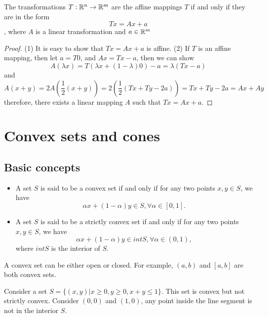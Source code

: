 \begin{refsection}
\begin{theorem}\cite[7]{rockafellar1997convex}
The transformations $T:\mathbb{R}^n\to \mathbb{R}^m$ are the affine mappings $T$ if and only if they are in the form $$Tx = Ax + a$$, where $A$ is a linear transformation and $a\in \mathbb{R}^m$
\end{theorem}
\begin{proof}
(1) It is easy to show that $Tx=Ax+a$ is affine. (2) If $T$ is an affine mapping, then let $a = T0$, and $Ax = Tx - a$, then we can show $$A(\lambda x) = T(\lambda x + (1-\lambda) 0) - a =\lambda (Tx - a)$$
and $$A(x + y) = 2A(\frac{1}{2}(x+y)) = 2(\frac{1}{2}(Tx + Ty -2a)) = Tx+Ty - 2a = Ax + Ay$$
therefore, there exists a linear mapping $A$ such that $Tx = Ax + a$.
\end{proof}

\section{Convex sets and cones}\label{ch:convex-optimization:sec:convex-set}
\subsection{Basic concepts}
\begin{definition}\hfill
\begin{itemize}
	\item 	A set $S$ is said to be a convex set if and only if for any two points $x,y\in S$, we have
	$$\alpha x + (1-\alpha) y \in S,\forall \alpha\in [0,1].$$
	\item 	A set $S$ is said to be a strictly convex set if and only if for any two points $x,y\in S$, we have
	$$\alpha x + (1-\alpha) y \in int S,\forall \alpha\in (0,1),$$
	where $int S$ is the interior of $S$.
\end{itemize}
\end{definition}

\begin{remark} A convex set can be either open or closed. For example, $(a,b)$ and $[a,b]$ are both convex sets.
\end{remark}

\begin{remark}
Consider a set $S = \{(x,y)| x\geq 0, y\geq 0, x + y \leq 1\}$. This set is convex but not strictly convex. Consider $(0,0)$ and $(1,0)$, any point inside the line segment is not in the interior $S$.	
	

\end{remark}
\end{refsection}
